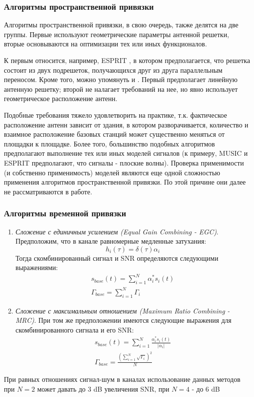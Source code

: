 \documentclass[a4paper,12pt,oneside, abstract=true]{scrartcl}
\begin{document}
\subsubsection{Алгоритмы пространственной привязки}
Алгоритмы пространственной привязки, в свою очередь, также делятся на две группы. Первые используют геометрические параметры антенной решетки, вторые основываются на оптимизации тех или иных функционалов.

К первым относится, например, ESPRIT \cite{A4}, в котором предполагается, что решетка состоит из двух подрешеток, получающихся друг из друга параллельным переносом. 
Кроме того, можно упомянуть \cite{A5} и \cite{A6}. 
Первый предполагает линейную антенную решетку; второй не налагает требований на нее, но явно использует геометрическое расположение антенн.

Подобные требования тяжело удовлетворить на практике, т.к. фактическое расположение антенн зависит от здания, в котором разворачивается, количество и взаимное расположение базовых станций может существенно меняться от площадки к площадке. 
Более того, большинство подобных алгоритмов предполагают выполнение тех или иных моделей сигналов (к примеру, MUSIC и ESPRIT предполагают, что сигналы - плоские волны). 
Проверка применимости (и собственно применимость) моделей являются еще одной сложностью применения алгоритмов пространственной привязки. 
По этой причине они далее не рассматриваются в работе. 
\subsubsection{Алгоритмы временной привязки}
\begin{enumerate}
\item \textit{Сложение с единичным усилением (Equal Gain Combining - EGC)}. Предположим, что в канале равномерные медленные затухания:
\begin{equation}
h_i(\tau) = \delta(\tau)\alpha_i
\label{eq:impulse}
\end{equation} 
Тогда скомбинированный сигнал и SNR определяются следующими выражениями:
\begin{gather}
s_{base}(t) = \sum\limits_{i=1}^N \alpha_i^*s_i(t) \\
\Gamma_{base} = \sum\limits_{i=1}^N \Gamma_i
\label{eq:egc}
\end{gather}
\item \textit{Сложение с максимальным отношением (Maximum Ratio Combining - MRC)}. При том же предположении имеются следующие выражения для скомбинированного сигнала и его SNR:
\begin{gather}
s_{base}(t) = \sum\limits_{i=1}^N \frac{\alpha_i^*s_i(t)}{|\alpha_i|} \\
\Gamma_{base} = \frac{\left(\sum\limits_{i=1}^N \sqrt{\Gamma_i}\right)^2}{N}
\label{eq:mrc}
\end{gather}
\end{enumerate}
При равных отношениях сигнал-шум в каналах использование данных методов при $N=2$ может давать до 3 dB увеличения SNR, при $N=4$ - до 6 dB
\end{document}
